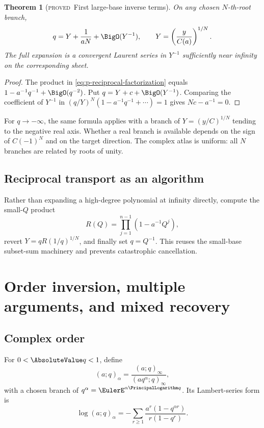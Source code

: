 \documentclass[11pt,letterpaper,oneside,openany]{book}
\newtheorem{theorem}{Theorem}[chapter]
\theoremstyle{definition}
\theoremstyle{remark}
\newcommand{\statusproved}{\textcolor{provedgreen}{\textsc{proved}}}
\begin{document}
\begin{theorem}[\statusproved\ First large-base inverse terms]
On any chosen \(N\)-th-root branch,
\begin{equation}
 q=Y+\frac1{aN}+\BigO(Y^{-1}),
 \qquad
 Y=\left(\frac{y}{C(a)}\right)^{1/N}.
 \label{eq:p-large-q-inverse}
\end{equation}
The full expansion is a convergent Laurent series in \(Y^{-1}\) sufficiently
near infinity on the corresponding sheet.
\end{theorem}
\begin{proof}
The product in \cref{eq:p-reciprocal-factorization} equals
\(1-a^{-1}q^{-1}+\BigO(q^{-2})\).  Put \(q=Y+c+\BigO(Y^{-1})\).  Comparing the
coefficient of \(Y^{-1}\) in
\((q/Y)^N(1-a^{-1}q^{-1}+\cdots)=1\) gives \(Nc-a^{-1}=0\).
\end{proof}

For \(q\to-\infty\), the same formula applies with a branch of
\(Y=(y/C)^{1/N}\) tending to the negative real axis.  Whether a real branch is
available depends on the sign of \(C(-1)^N\) and on the target direction.  The
complex atlas is uniform: all \(N\) branches are related by roots of unity.

\section{Reciprocal transport as an algorithm}
Rather than expanding a high-degree polynomial at infinity directly, compute
the small-\(Q\) product
\[
 R(Q)=\prod_{j=1}^{n-1}(1-a^{-1}Q^j),
\]
revert \(Y=qR(1/q)^{1/N}\), and finally set \(q=Q^{-1}\).  This reuses the
small-base subset-sum machinery and prevents catastrophic cancellation.

\chapter{Order inversion, multiple arguments, and mixed recovery}

\section{Complex order}
For \(0<\AbsoluteValue q<1\), define
\begin{equation}
 (a;q)_\alpha=\frac{(a;q)_\infty}{(aq^\alpha;q)_\infty},
 \label{eq:complex-order}
\end{equation}
with a chosen branch of \(q^\alpha=\EulerE^{\alpha\PrincipalLogarithm q}\).  Its Lambert-series
form is
\begin{equation}
 \log(a;q)_\alpha
 =-\sum_{r\ge1}\frac{a^r(1-q^{\alpha r})}{r(1-q^r)}.
 \label{eq:complex-order-lambert}
\end{equation}
\end{document}
